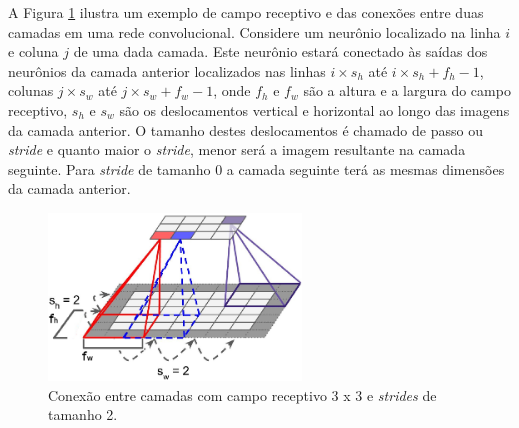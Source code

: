 A Figura \ref{fig:cnn_stride} ilustra  um exemplo de campo receptivo e das conexões entre duas camadas em uma rede convolucional.
Considere um neurônio localizado na linha $i$ e coluna $j$ de uma dada camada.
Este neurônio estará conectado às saídas dos neurônios da camada anterior
localizados nas linhas ${i}\times{s_h}$ até ${i}\times{s_h}+f_h - 1$, colunas
${j}\times{s_w}$ até ${j}\times{s_w}+f_w - 1$, onde
$f_h$ e $f_w$ são a altura e a largura do campo receptivo, $s_h$ e $s_w$
são os deslocamentos vertical e horizontal ao longo das imagens da camada anterior.
O tamanho destes deslocamentos é chamado de passo ou \textit{stride}
e quanto maior o \textit{stride}, menor será a imagem resultante na camada seguinte. Para \textit{stride}
de tamanho $0$ a camada seguinte terá as mesmas dimensões da camada anterior.
\begin{figure}[htp]
\begin{center}
  \includegraphics[width=0.6\textwidth]{fig/cnn_layer_stride_2}
  \caption{Conexão entre camadas com campo receptivo 3 x 3 e \textit{strides} de tamanho 2.}
  \label{fig:cnn_stride}
\end{center}
\end{figure}

